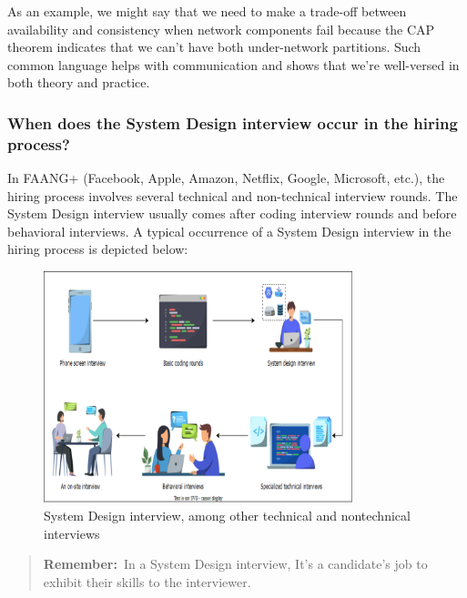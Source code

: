 As an example, we might say that we need to make a trade-off between availability and consistency when network components fail because the CAP theorem indicates that we can't have both under-network partitions. Such common language helps with communication and shows that we're well-versed in both theory and practice.

\subsubsection{When does the System Design interview occur in the hiring process?}\label{When-does-the-System-Design-interview-occur-in-the-hiring-process}

In FAANG+ (Facebook, Apple, Amazon, Netflix, Google, Microsoft, etc.), the hiring process involves several technical and non-technical interview rounds. The System Design interview usually comes after coding interview rounds and before behavioral interviews. A typical occurrence of a System Design interview in the hiring process is depicted below:

\begin{figure}[htbp]
 \centering
 \includegraphics[width=0.8\textwidth]{Images/chapter_1/section_4771234193080320/6020586474438656.png}
 \caption{System Design interview, among other technical and nontechnical interviews}
\end{figure}

\begin{quote}
\textbf{Remember:}~In a System Design interview, It's a candidate's job to exhibit their skills to the interviewer.
\end{quote}

